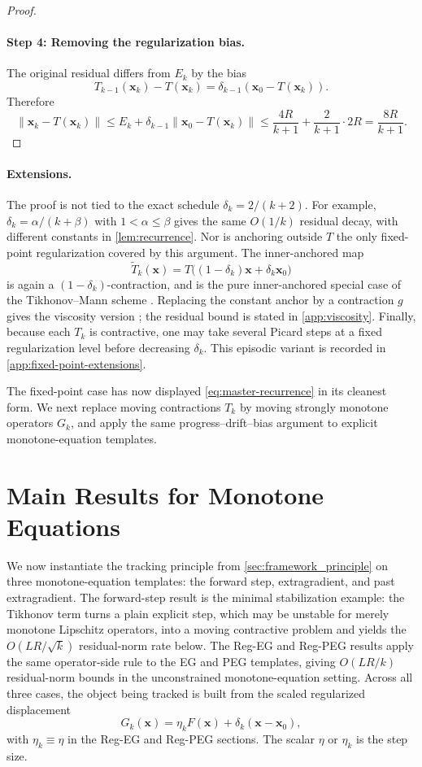 \documentclass[letterpaper,11pt]{article}
\newcommand{\norm}[1]{\left\| #1 \right\|}
\newcommand{\vect}[1]{\mathbf{#1}}
\begin{document}
\begin{proof}
\paragraph{Step 4: Removing the regularization bias.}
The original residual differs from \(E_k\) by the bias
\[
    T_{k-1}(\vect{x}_k)-T(\vect{x}_k)
    =
    \delta_{k-1}(\vect{x}_0-T(\vect{x}_k)).
\]
Therefore
\[
    \norm{\vect{x}_k-T(\vect{x}_k)}
    \le
    E_k+\delta_{k-1}\norm{\vect{x}_0-T(\vect{x}_k)}
    \le
    \frac{4R}{k+1}+\frac{2}{k+1}\cdot2R
    =
    \frac{8R}{k+1}.
\]
\end{proof}

\paragraph{Extensions.}
The proof is not tied to the exact schedule \(\delta_k=2/(k+2)\). For example,
\(\delta_k=\alpha/(k+\beta)\) with \(1<\alpha\le\beta\) gives the same
\(O(1/k)\) residual decay, with different constants in \cref{lem:recurrence}.
Nor is anchoring outside \(T\) the only fixed-point regularization covered by this
argument. The inner-anchored map
\[
    \widetilde T_k(\vect{x})
    =
    T\bigl((1-\delta_k)\vect{x}+\delta_k\vect{x}_0\bigr)
\]
is again a \((1-\delta_k)\)-contraction, and is the pure inner-anchored
special case of the Tikhonov--Mann scheme \cite{cheval2023modified}. Replacing
the constant anchor by a contraction \(g\) gives the viscosity version
\cite{moudafi2000viscosity,xu2004viscosity}; the residual bound is stated in
\cref{app:viscosity}. Finally, because each \(T_k\) is contractive, one may take
several Picard steps at a fixed regularization level before decreasing
\(\delta_k\). This episodic variant is recorded in
\cref{app:fixed-point-extensions}.

The fixed-point case has now displayed \eqref{eq:master-recurrence} in its
cleanest form. We next replace moving contractions \(T_k\) by moving strongly
monotone operators \(G_k\), and apply the same progress--drift--bias argument to
explicit monotone-equation templates.

\section{Main Results for Monotone Equations}
\label{sec:main-results}
We now instantiate the tracking principle from
\cref{sec:framework_principle} on three monotone-equation templates: the
forward step, extragradient, and past extragradient. The forward-step result is
the minimal stabilization example: the Tikhonov term turns a plain explicit
step, which may be unstable for merely monotone Lipschitz operators, into a
moving contractive problem and yields the \(O(LR/\sqrt{k})\) residual-norm rate
below. The Reg-EG and Reg-PEG results apply the same operator-side rule to the
EG and PEG templates, giving \(O(LR/k)\) residual-norm bounds in the
unconstrained monotone-equation setting. Across all three cases, the object
being tracked is built from the scaled regularized displacement
\[
    G_k(\vect{x})=\eta_k F(\vect{x})+\delta_k(\vect{x}-\vect{x}_0),
\]
with \(\eta_k\equiv\eta\) in the Reg-EG and Reg-PEG sections. The scalar
\(\eta\) or \(\eta_k\) is the step size.
\end{document}
